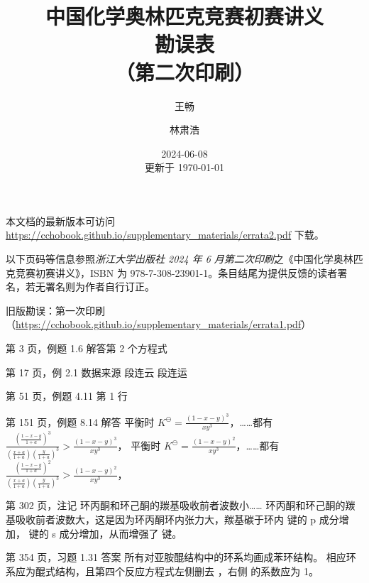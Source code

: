 \documentclass{errata}
\title{中国化学奥林匹克竞赛初赛讲义 \\ {\bfseries 勘误表} \\ （第二次印刷）}
\author{王畅 \and 林肃浩}
\date{2024-06-08 \\ 更新于 \today}
\begin{document}
    \maketitle
    本文档的最新版本可访问 \url{https://cchobook.github.io/supplementary_materials/errata2.pdf} 下载。

    以下页码等信息参照\emph{浙江大学出版社 2024 年 6 月第二次印刷}之《中国化学奥林匹克竞赛初赛讲义》，ISBN 为 978-7-308-23901-1。条目结尾为提供反馈的读者署名，若无署名则为作者自行订正。
    
    旧版勘误：第一次印刷（\url{https://cchobook.github.io/supplementary_materials/errata1.pdf}）

    \begin{Errata}
        \item[第 3 页，例题 1.6 解答第 2 个方程式]
            \Orig {}
            \Corr {}
        \item[第 17 页，例 2.1 数据来源]
            \Orig 段连云
            \Corr 段连运
        \item[第 51 页，例题 4.11 第 1 行]
            \Orig {}
            \Corr {}
        \item[第 151 页，例题 8.14 解答]
            \Orig 平衡时 $K^\ominus = \frac{(1-x-y)^3}{xy^3}$，……都有 $\frac{\left(\frac{1-x-y}{1+a} \right)^3}{\left(\frac{x+a}{1+a} \right) \left(\frac{y}{1+a} \right)^3} > \frac{(1-x-y)^3}{xy^3}$，
            \Corr 平衡时 $K^\ominus = \frac{(1-x-y)^2}{xy^3}$，……都有 $\frac{\left(\frac{1-x-y}{1+a} \right)^2}{\left(\frac{x+a}{1+a} \right) \left(\frac{y}{1+a} \right)^3} > \frac{(1-x-y)^2}{xy^3}$，
        \item[第 302 页，注记]
            \Orig 环丙酮和环己酮的羰基吸收前者波数小……
            \Corr 环丙酮和环己酮的羰基吸收前者波数大，这是因为环丙酮环内张力大，羰基碳于环内  键的 p 成分增加， 键的 s 成分增加，从而增强了  键。
        \item[第 354 页，习题 1.31 答案]
            \Orig 所有对亚胺醌结构中的环系均画成苯环结构。
            \Corr 相应环系应为醌式结构，且第四个反应方程式左侧删去 ，右侧  的系数应为 1。
    \end{Errata}

    \renewcommand{\em}{\itshape}
    \renewcommand*{\bibfont}{\footnotesize}
    \renewcommand{\refname}{参考文献}
    \renewcommand{\bibname}{参考文献}
    \printbibliography
\end{document}
